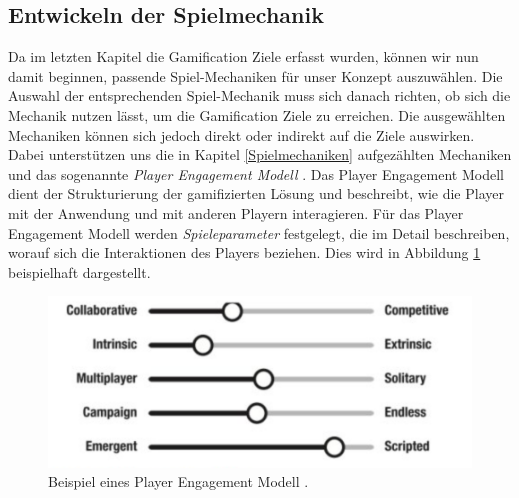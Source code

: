 \documentclass[a4paper,12pt,twoside]{scrartcl}
\begin{document}
\subsection{Entwickeln der Spielmechanik}
Da im letzten Kapitel die Gamification Ziele erfasst wurden, können wir nun damit beginnen, passende Spiel-Mechaniken für unser Konzept auszuwählen. Die Auswahl der entsprechenden Spiel-Mechanik muss sich danach richten, ob sich die Mechanik nutzen lässt, um die Gamification Ziele zu erreichen. Die ausgewählten Mechaniken können sich jedoch direkt oder indirekt auf die Ziele auswirken. Dabei unterstützen uns die in Kapitel \ref{Spielmechaniken} aufgezählten Mechaniken und das sogenannte \textit{Player Engagement Modell} \cite{gamificationDefinition}. Das Player Engagement Modell dient der Strukturierung der gamifizierten Lösung und beschreibt, wie die Player mit der Anwendung und mit anderen Playern interagieren. Für das Player Engagement Modell werden \textit{Spieleparameter} festgelegt, die im Detail beschreiben, worauf sich die Interaktionen des Players beziehen. Dies wird in Abbildung \ref{PlayerEngagementModel} beispielhaft dargestellt. 
\\
\begin{figure}[h!]
\begin{center}
\includegraphics[scale = 0.4]{Bilder/PlayerEngagementModel.png}
\caption{Beispiel eines Player Engagement Modell \cite{gamificationDefinition}.}
\label{PlayerEngagementModel}
\end{center}
\end{figure}
\end{document}
